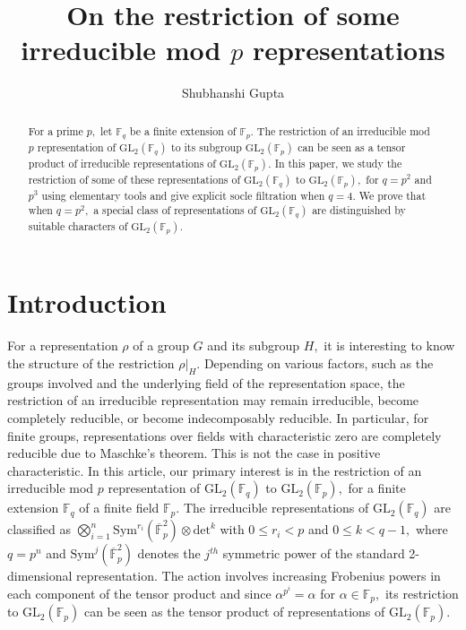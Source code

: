 \documentclass[10pt, reqno]{amsart}
\def\F{{\mathbb F}}
\def\OFs{{\overline{\mathbb F}}_p^2}
\numberwithin{equation}{section}
\theoremstyle{remark}
\begin{document}
	
    
        \title[Restriction of irreducible representations]{On the restriction of some irreducible mod $p$ representations}
	\author{Shubhanshi Gupta}
	
        \address{Department of Basic Sciences, IITRAM, Ahmedabad - 380026, India.}
	
	
	\date{}
	
	
        \begin{abstract}
          For a prime $p,$ let $\F_q$ be a finite extension of $\F_p.$ The restriction of an irreducible mod $p$ representation of $\text{GL}_2(\F_q)$ to its subgroup $\text{GL}_2(\F_p)$ can be seen as a tensor product of irreducible representations of $\text{GL}_2(\F_p).$ In this paper, we study the restriction of some of these representations of $\text{GL}_2(\F_q)$ to $\text{GL}_2(\F_p),$ for $q=p^2$ and $p^3$ using elementary tools and give explicit socle filtration when $q=4.$ We prove that when $q=p^2,$ a special class of representations of $\text{GL}_2(\F_q)$ are distinguished by suitable characters of $\text{GL}_2(\F_p).$
	\end{abstract}
	\maketitle
	

\section{Introduction}\label{S1}

   For a representation $\rho$ of a group $G$ and its subgroup $H,$ it is interesting to know the structure of the restriction ${\rho|}_H.$ Depending on various factors, such as the groups involved and the underlying field of the representation space, the restriction of an irreducible representation may remain irreducible, become completely reducible, or become indecomposably reducible. In particular, for finite groups, representations over fields with characteristic zero are completely reducible due to Maschke's theorem. This is not the case in positive characteristic. In this article, our primary interest is in the restriction of an irreducible mod $p$ representation of $\text{GL}_2(\F_q)$ to $\text{GL}_2(\F_p),$ for a finite extension $\F_q$ of a finite field $\F_p.$ The irreducible representations of $\text{GL}_2(\F_q)$ are classified as $\bigotimes\limits_{i=1}^n\text{Sym}^{r_i}(\OFs)\otimes\mathrm{det}^k$ with $0\leq r_i<p$ and $0\leq k< q-1,$ where $q=p^n$ and $\text{Sym}^j(\OFs)$ denotes the $j^{th}$ symmetric power of the standard 2-dimensional representation. The action involves increasing Frobenius powers in each component of the tensor product and since $\alpha^{p^i}=\alpha$ for $\alpha\in\F_p,$ its restriction to $\text{GL}_2(\F_p)$ can be seen as the tensor product of representations of $\text{GL}_2(\F_p).$
   
\end{document}

